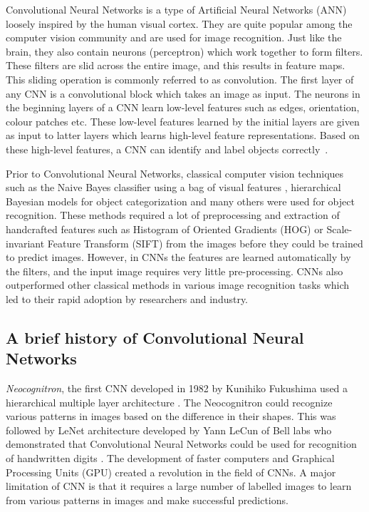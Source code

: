 Convolutional Neural Networks is a type of Artificial Neural Networks (ANN) loosely inspired by the human visual cortex.  They are quite popular among the computer vision community and are used for image recognition. Just like the brain, they also contain neurons (perceptron) which work together to form filters. These filters are slid across the entire image, and this results in feature maps. This sliding operation is commonly referred to as convolution. The first layer of any CNN is a convolutional block which takes an image as input. The neurons in the beginning layers of a CNN learn low-level features such as edges, orientation, colour patches etc. These low-level features learned by the initial layers are given as input to latter layers which learns high-level feature representations. Based on these high-level features, a CNN can identify and label objects correctly~\cite{CNNREF1, CNNREF2}.




Prior to Convolutional Neural Networks, classical computer vision techniques such as the Naive Bayes classifier using a bag of visual features \cite{Csurka2004}, hierarchical Bayesian models for object categorization \cite{SivicREZF05} and many others were used for object recognition. These methods required a lot of preprocessing and extraction of handcrafted features such as Histogram of Oriented Gradients (HOG) or Scale-invariant Feature Transform (SIFT) from the images before they could be trained to predict images. However, in CNNs the features are learned automatically by the filters, and the input image requires very little pre-processing. CNNs also outperformed other classical methods in various image recognition tasks which led to their rapid adoption by researchers and industry. 


\subsection{A brief history of Convolutional Neural Networks}
\textit{Neocognitron}, the first CNN developed in 1982 by  Kunihiko Fukushima used a hierarchical multiple layer architecture \cite{FukushimaM82}.  The Neocognitron could recognize various patterns in images based on the difference in their shapes. This was followed by LeNet architecture developed by Yann LeCun of Bell labs who demonstrated that Convolutional Neural Networks could be used for recognition of handwritten digits \cite{LeNet1989}. The development of faster computers and Graphical Processing Units (GPU) created a revolution in the field of CNNs.  A major limitation of CNN is that it requires a large number of labelled images to learn from various patterns in images and make successful predictions. 


